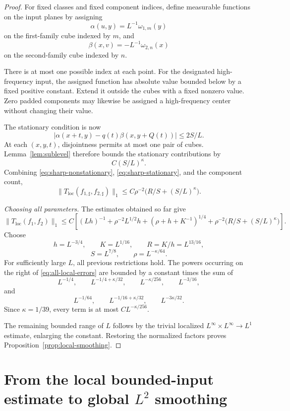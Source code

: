 \documentclass[11pt,a4paper]{article}
\begin{document}
\begin{proof}
For fixed classes and fixed component indices, define measurable
functions on the input planes by assigning
\[
\alpha(u,y)=L^{-1}\omega_{1,m}(y)
\]
on the first-family cube indexed by $m$, and
\[
\beta(x,v)=-L^{-1}\omega_{2,n}(x)
\]
on the second-family cube indexed by $n$.

There is at most one possible index at each point. For the designated
high-frequency input, the assigned function has absolute value bounded
below by a fixed positive constant. Extend it outside the cubes with a
fixed nonzero value. Zero padded components may likewise be assigned a
high-frequency center without changing their value.

The stationary condition is now
\[
|\alpha(x+t,y)-q(t)\beta(x,y+Q(t))|\leq2S/L.
\]
At each $(x,y,t)$, disjointness permits at most one pair of cubes.
Lemma~\ref{lem:sublevel} therefore bounds the stationary contributions by
\[
C(S/L)^\kappa.
\tag{6.15}\label{eq:sharp-stationary}
\]
Combining \eqref{eq:sharp-nonstationary}, \eqref{eq:sharp-stationary}, and
the component count,
\[
\|T_{\mathrm{loc}}(f_{1,\sharp},f_{2,\sharp})\|_1
\leq C\rho^{-2}\bigl(R/S+(S/L)^\kappa\bigr).
\tag{6.16}\label{eq:sharp-terms}
\]

\medskip
\noindent\textit{Choosing all parameters.}
The estimates obtained so far give
\[
\|T_{\mathrm{loc}}(f_1,f_2)\|_1
\leq C\left[
(Lh)^{-1}+\rho^{-2}L^{1/2}h
+(\rho+h+K^{-1})^{1/4}
+\rho^{-2}\bigl(R/S+(S/L)^\kappa\bigr)\right].
\tag{6.17}\label{eq:all-local-errors}
\]
Choose
\[
h=L^{-3/4},\qquad K=L^{1/16},\qquad R=K/h=L^{13/16},
\]
\[
S=L^{7/8},\qquad\rho=L^{-\kappa/64}.
\tag{6.18}\label{eq:parameters}
\]
For sufficiently large $L$, all previous restrictions hold. The powers
occurring on the right of \eqref{eq:all-local-errors} are bounded by a
constant times the sum of
\[
L^{-1/4},\qquad L^{-1/4+\kappa/32},\qquad
L^{-\kappa/256},\qquad L^{-3/16},
\]
and
\[
L^{-1/64},\qquad L^{-1/16+\kappa/32},\qquad L^{-3\kappa/32}.
\]
Since $\kappa=1/39$, every term is at most $CL^{-\kappa/256}$.

The remaining bounded range of $L$ follows by the trivial localized
$L^\infty\times L^\infty\to L^1$ estimate, enlarging the constant.
Restoring the normalized factors proves Proposition~\ref{prop:local-smoothing}.
\end{proof}

\section{From the local bounded-input estimate to global \texorpdfstring{$L^2$}{L2} smoothing}
\end{document}
